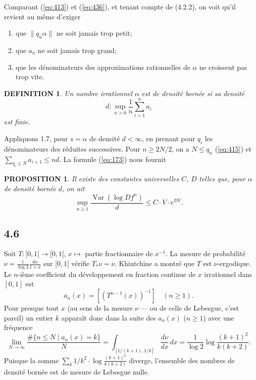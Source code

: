 \documentclass[12pt]{amsart}
\theoremstyle{plain}
\newtheorem{proposition}[theoreme]{PROPOSITION}
\newtheorem{definition}[theoreme]{DEFINITION}
\theoremstyle{remark}
\DeclareMathOperator*{\Var}{Var}
\begin{document}
Comparant (\ref{eq:413}) et (\ref{eq:436}), et tenant compte de (4.2.2), on voit qu'il revient au m\^{e}me d'exiger
\begin{enumerate}
\item[(a)] que $\|q_{n}\alpha\|$ ne soit jamais trop petit;
\item[(b)] que $a_{n}$ ne soit jamais trop grand;
\item[(c)] que les d\'{e}nominateurs des approximations rationnelles de $\alpha$ ne croissent pas trop vite.
\end{enumerate}

\begin{definition}\label{def:44}
Un nombre irrationnel $\alpha$ est de densit\'{e} born\'{e}e si sa densit\'{e}
\[
d : \sup_{n > 0} \frac{1}{n} \sum_{i=1}^{n} a_{i}
\]
est finie.
\end{definition}

Appliquons 1.7, pour $s = \alpha$ de densit\'{e} $d < \infty$, en prenant pour $q_{i}$ les d\'{e}nominateurs des r\'{e}duites successives. Pour $n \geq 2N/2$, on a $N \leq q_{n}$ (\ref{eq:415}) et $\sum_{q_{i} \leq N} a_{i+1} \leq nd$. La formule (\ref{eq:173}) nous fournit

\begin{proposition}\label{prop:45}
Il existe des constantes universelles $C$, $D$ telles que, pour $\alpha$ de densit\'{e} born\'{e}e $d$, on ait
\[
\sup_{n \geq 1} \frac{\Var(\log Df^{n})}{d} \leq C \cdot V \cdot e^{DV} .
\]
\end{proposition}

\subsection*{4.6}
Soit $T : [0,1[ \to [0,1[$, $x \mapsto$ partie fractionnaire de $x^{-1}$. La mesure de probabilit\'{e} $\nu = \frac{1}{\log 2}\frac{dx}{1+x}$ sur $[0,1[$ v\'{e}rifie $T_{*}\nu = \nu$. Khintchine a montr\'{e} que $T$ est $\nu$-ergodique. Le $n$-i\`{e}me coefficient du d\'{e}veloppement en fraction continue de $x$ irrationnel dans $[0,1]$ est
\[
a_{n}(x) = [(T^{n-1}(x))^{-1}] \quad (n \geq 1) .
\]
Pour presque tout $x$ (au sens de la mesure $\nu$ --- ou de celle de Lebesgue, c'est pareil) un entier $k$ appara\^{i}t donc dans la suite des $a_{n}(x)$ ($n \geq 1$) avec une fr\'{e}quence
\[
\lim_{N \to \infty} \frac{\#\{n \leq N \mid a_{n}(x) = k\}}{N} = \int_{[1/(k+1), 1/k]} \frac{d\nu}{dx}\,dx = \frac{1}{\log 2}\log\frac{(k+1)^{2}}{k(k+2)} .
\]
Puisque la somme $\sum_{k} 1/k^{2} \cdot \log\frac{(k+1)^{2}}{k(k+2)}$ diverge, l'ensemble des nombres de densit\'{e} born\'{e}e est de mesure de Lebesgue nulle.
\end{document}
